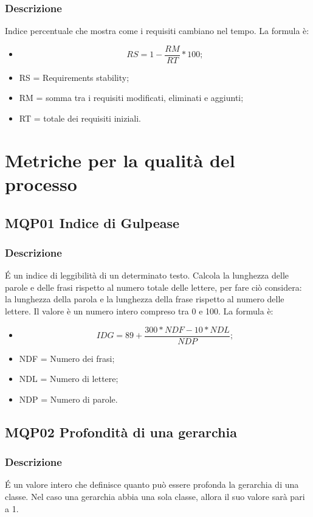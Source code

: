 \documentclass[a4paper]{article}
\begin{document}
\subsubsection{Descrizione}
Indice percentuale che mostra come i requisiti cambiano nel tempo.
La formula è:
\begin{itemize}
  \item \[RS = 1 - \frac{RM}{RT} * 100;\]
  \item RS = Requirements stability;
  \item RM = somma tra i requisiti modificati, eliminati e aggiunti;
  \item RT = totale dei requisiti iniziali.
  \end{itemize}

\section{Metriche per la qualità del processo}

\subsection{MQP01 Indice di Gulpease}
\subsubsection{Descrizione}
\'E un indice di leggibilità di un determinato testo. Calcola la lunghezza delle parole e delle frasi rispetto al numero totale delle lettere, per fare ciò considera: la lunghezza della parola e la lunghezza della frase rispetto al numero delle lettere. Il valore è un numero intero compreso tra 0 e 100.
La formula è:
\begin{itemize}
  \item \[IDG =  89 + \frac{300 * NDF - 10 * NDL}{NDP};\]
  \item NDF = Numero dei frasi;
  \item NDL = Numero di lettere;
  \item NDP = Numero di parole.
  \end{itemize}

\subsection{MQP02 Profondità di una gerarchia}
\subsubsection{Descrizione}
\'E un valore intero che definisce quanto può essere profonda la gerarchia di una classe. Nel caso una gerarchia abbia una sola classe, allora il suo valore sarà pari a 1.
\end{document}
